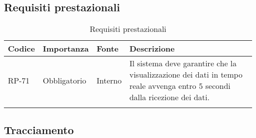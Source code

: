 \subsection{Requisiti prestazionali}
\begin{longtable}{|>{\centering\arraybackslash}m{}|>{\centering\arraybackslash}m{}|>{\centering\arraybackslash}m{}|>{\centering\arraybackslash}m{}|}
	\hline
	\textbf{Codice} & \textbf{Importanza} & \textbf{Fonte} & \textbf{Descrizione}
	\\\hline
	\endhead
	RP-71           & Obbligatorio        & Interno        & Il sistema deve garantire che la visualizzazione dei dati in tempo reale avvenga entro 5 secondi dalla ricezione dei dati.
	\\\hline
	\caption{Requisiti prestazionali}
\end{longtable}

\newpage

\subsection{Tracciamento}
